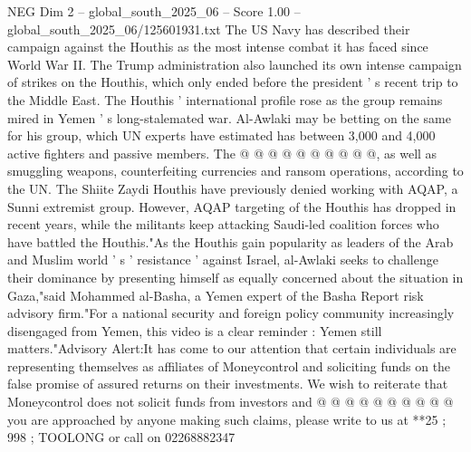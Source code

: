\begin{textsample}{NEG Dim 2 – global\_south\_2025\_06 – Score 1.00 – global\_south\_2025\_06/125601931.txt}
The US Navy has described their campaign against the Houthis as the most intense combat it has faced since World War II.
The Trump administration also launched its own intense campaign of strikes on the Houthis, which only ended before the president ' s recent trip to the Middle East.
The Houthis ' international profile rose as the group remains mired in Yemen ' s long-stalemated war.
Al-Awlaki may be betting on the same for his group, which UN experts have estimated has between 3,000 and 4,000 active fighters and passive members.
The @ @ @ @ @ @ @ @ @ @, as well as smuggling weapons, counterfeiting currencies and ransom operations, according to the UN.
The Shiite Zaydi Houthis have previously denied working with AQAP, a Sunni extremist group.
However, AQAP targeting of the Houthis has dropped in recent years, while the militants keep attacking Saudi-led coalition forces who have battled the Houthis."As the Houthis gain popularity as leaders of the Arab and Muslim world ' s ' resistance ' against Israel, al-Awlaki seeks to challenge their dominance by presenting himself as equally concerned about the situation in Gaza,"said Mohammed al-Basha, a Yemen expert of the Basha Report risk advisory firm."For a national security and foreign policy community increasingly disengaged from Yemen, this video is a clear reminder : Yemen still matters."Advisory Alert:It has come to our attention that certain individuals are representing themselves as affiliates of Moneycontrol and soliciting funds on the false promise of assured returns on their investments.
We wish to reiterate that Moneycontrol does not solicit funds from investors and @ @ @ @ @ @ @ @ @ @ you are approached by anyone making such claims, please write to us at **25 ; 998 ; TOOLONG or call on 02268882347

\end{textsample}
